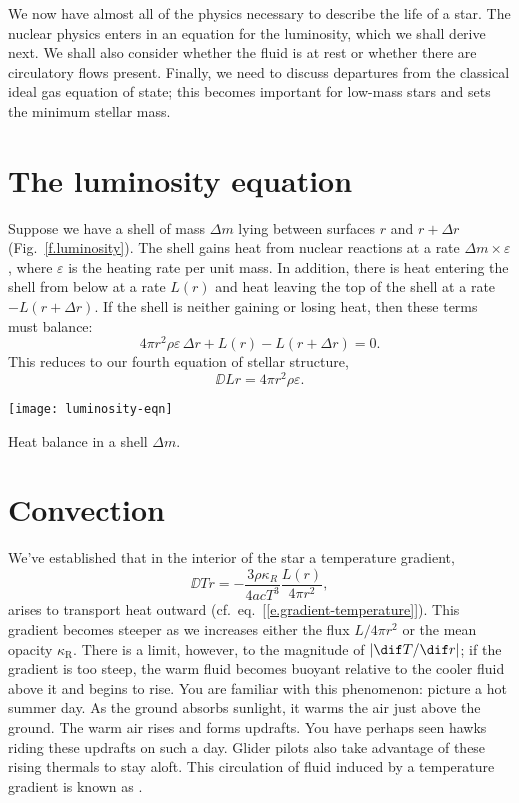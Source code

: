 
We now have almost all of the physics necessary to describe the life of a star. 
The nuclear physics enters in an equation for the luminosity, which we shall derive next. We shall also consider whether the fluid is at rest or whether there are circulatory flows present. Finally, we need to discuss departures from the classical ideal gas equation of state; this becomes important for low-mass stars and sets the minimum stellar mass.

\section{The luminosity equation}

Suppose we have a shell of mass $\Delta m$ lying between surfaces $r$ and $r+\Delta r$ (Fig.~\ref{f.luminosity}). The shell gains heat from nuclear reactions at a rate $\Delta m \times \varepsilon$, where $\varepsilon$ is the heating rate per unit mass.  In addition, there is heat entering the shell from below at a rate $L(r)$ and heat leaving the top of the shell at a rate $-L(r+\Delta r)$.
If the shell is neither gaining or losing heat, then these terms must balance:
\[ 4\pi r^{2}\rho\varepsilon\,\Delta r + L(r) - L(r+\Delta r) = 0. \]
This reduces to our fourth equation of stellar structure,
\begin{equation}
\label{e.luminosity}
\DD{L}{r} = 4\pi r^{2}\rho\varepsilon.
\end{equation}
\begin{marginfigure}
\texttt{[image: luminosity-eqn]}
\caption[Heat balance in a mass shell]{Heat balance in a shell $\Delta m$.}
\label{f.luminosity}
\end{marginfigure}

\section{Convection}\label{s.convection}

We've established that in the interior of the star a temperature gradient,
\[
	\DD{T}{r} = -\frac{3\rho\kappa_{R}}{4acT^3}\frac{L(r)}{4\pi r^2},
\]
arises to transport heat outward (cf.\ eq.~[\ref{e.gradient-temperature}]).
This gradient becomes steeper as we increases either the flux $L/4\pi r^{2}$ or the mean opacity $\kappa_{\mathrm{R}}$. There is a limit, however, to the magnitude of $|\dif T/\dif r|$; if the gradient is too steep, the warm fluid becomes buoyant relative to the cooler fluid above it and begins to rise. You are familiar with this phenomenon: picture a hot summer day. As the ground absorbs sunlight, it warms the air just above the ground. The warm air rises and forms updrafts. You have perhaps seen hawks riding these updrafts on such a day. Glider pilots also take advantage of these rising thermals to stay aloft. This circulation of fluid induced by a temperature gradient is known as . 

